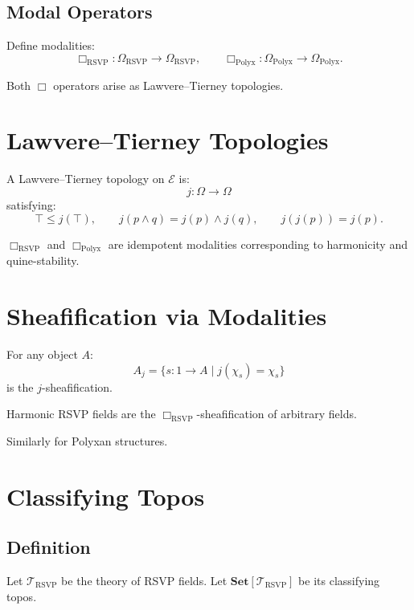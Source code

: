 \subsection{Modal Operators}

Define modalities:
\[
\Box_{\mathrm{RSVP}} : \Omega_{\mathrm{RSVP}} \to \Omega_{\mathrm{RSVP}},
\qquad
\Box_{\mathrm{Polyx}} : \Omega_{\mathrm{Polyx}} \to \Omega_{\mathrm{Polyx}}.
\]

\begin{proposition}
Both $\Box$ operators arise as Lawvere–Tierney topologies.
\end{proposition}

\section{Lawvere–Tierney Topologies}

A Lawvere–Tierney topology on $\mathscr{E}$ is:
\[
j : \Omega \to \Omega
\]
satisfying:
\[
\top \le j(\top), \qquad
j(p\wedge q)=j(p)\wedge j(q), \qquad
j(j(p)) = j(p).
\]

\begin{proposition}
$\Box_{\mathrm{RSVP}}$ and $\Box_{\mathrm{Polyx}}$ are idempotent modalities corresponding to harmonicity and quine-stability.
\end{proposition}

\section{Sheafification via Modalities}

For any object $A$:
\[
A_j = \{ s : 1\to A \mid j(\chi_s)=\chi_s \}
\]
is the $j$-sheafification.

\begin{proposition}
Harmonic RSVP fields are the $\Box_{\mathrm{RSVP}}$-sheafification of arbitrary fields.
\end{proposition}

Similarly for Polyxan structures.

\section{Classifying Topos}

\subsection{Definition}

Let $\mathcal{T}_{\mathrm{RSVP}}$ be the theory of RSVP fields.  
Let $\mathbf{Set}[\mathcal{T}_{\mathrm{RSVP}}]$ be its classifying topos.

